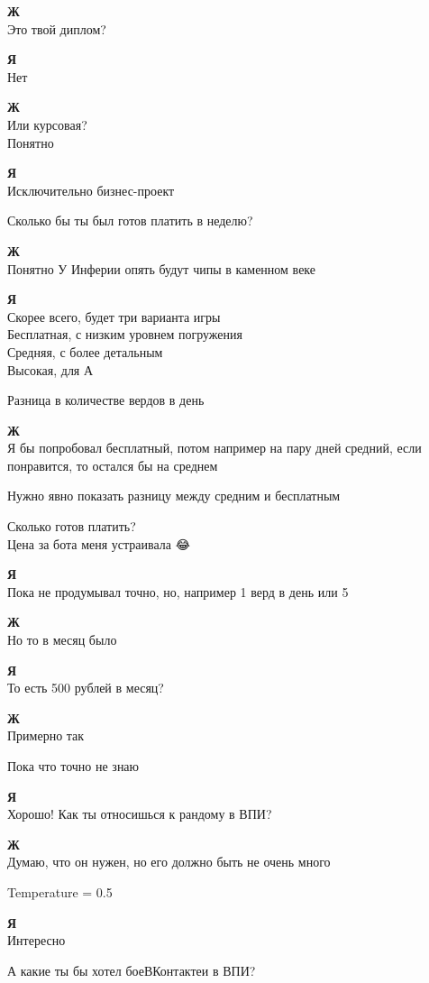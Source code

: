 \textbf{Ж}\\
Это твой диплом?

\textbf{Я}\\
Нет

\textbf{Ж}\\
Или курсовая?\\
Понятно

\textbf{Я}\\
Исключительно бизнес-проект

Сколько бы ты был готов платить в неделю?

\textbf{Ж}\\
Понятно
У Инферии опять будут чипы в каменном веке

\textbf{Я}\\
Скорее всего, будет три варианта игры\\
Бесплатная, с низким уровнем погружения\\
Средняя, с более детальным\\
Высокая, для А

Разница в количестве вердов в день

\textbf{Ж}\\
Я бы попробовал бесплатный, потом например на пару дней средний, если понравится, то остался бы на среднем

Нужно явно показать разницу между средним и бесплатным

Сколько готов платить?\\
Цена за бота меня устраивала 😂🎅

\textbf{Я}\\
Пока не продумывал точно, но, например 1 верд в день или 5

\textbf{Ж}\\
Но то в месяц было

\textbf{Я}\\
То есть 500 рублей в месяц?

\textbf{Ж}\\
Примерно так

Пока что точно не знаю

\textbf{Я}\\
Хорошо! Как ты относишься к рандому в ВПИ?

\textbf{Ж}\\
Думаю, что он нужен, но его должно быть не очень много

Temperature = 0.5

\textbf{Я}\\
Интересно

А какие ты бы хотел боеВКонтактеи в ВПИ?

